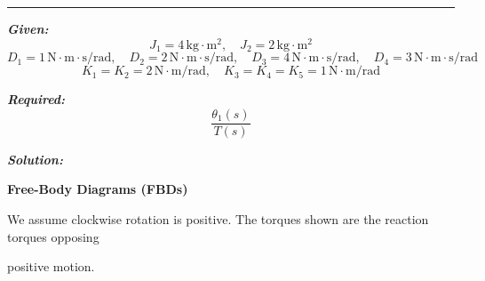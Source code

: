 \documentclass[11pt]{article}
\begin{document}
\noindent\rule{\textwidth}{1pt}

\vspace{12pt}


\noindent\textbf{\textit{Given:}}
\[
J_1 = 4\, \text{kg}\cdot\text{m}^2, \quad J_2 = 2\, \text{kg}\cdot\text{m}^2
\]
\[
D_1 = 1\, \text{N}\cdot\text{m}\cdot\text{s/rad}, \quad D_2 = 2\, \text{N}\cdot\text{m}\cdot\text{s/rad}, \quad D_3 = 4\, \text{N}\cdot\text{m}\cdot\text{s/rad}, \quad D_4 = 3\, \text{N}\cdot\text{m}\cdot\text{s/rad}
\]
\[
K_1 = K_2 = 2\, \text{N}\cdot\text{m/rad}, \quad K_3 = K_4 = K_5 = 1\, \text{N}\cdot\text{m/rad}
\]


\vspace{1em}
\noindent

\noindent\textbf{\textit{Required:}}
\[
\frac{\theta_1(s)}{T(s)}
\]

\vspace{1.5em}
\noindent\textbf{\textit{Solution:}}

\vspace{8pt}

\noindent\textbf{Free-Body Diagrams (FBDs)}
\vspace{12pt}

We assume clockwise rotation is positive. The torques shown are the reaction torques opposing

positive motion.
\end{document}

